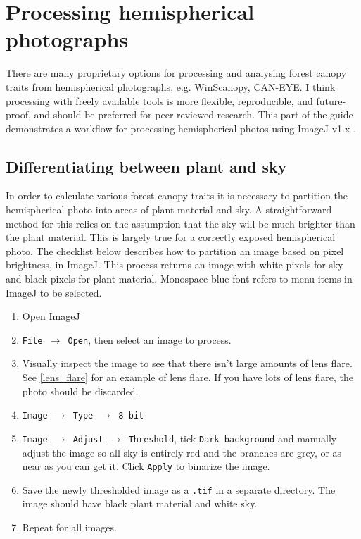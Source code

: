 \documentclass[11pt,a4paper]{article}
\newcommand\menu[1]{\texttt{\color{blue}#1}}
\newcommand\file[1]{\texttt{\underline{#1}}}
\begin{document}
\section{Processing hemispherical photographs}

There are many proprietary options for processing and analysing forest canopy traits from hemispherical photographs, e.g. WinScanopy, CAN-EYE. I think processing with freely available tools is more flexible, reproducible, and future-proof, and should be preferred for peer-reviewed research. This part of the guide demonstrates a workflow for processing hemispherical photos using ImageJ v1.x \citep{Schneider2012}.

\subsection{Differentiating between plant and sky}

In order to calculate various forest canopy traits it is necessary to partition the hemispherical photo into areas of plant material and sky. A straightforward method for this relies on the assumption that the sky will be much brighter than the plant material. This is largely true for a correctly exposed hemispherical photo. The checklist below describes how to partition an image based on pixel brightness, in ImageJ. This process returns an image with white pixels for sky and black pixels for plant material. Monospace blue font refers to menu items in ImageJ to be selected.

\begin{enumerate}
	\item{Open ImageJ}
	\item{\menu{File $\rightarrow$ Open}, then select an image to process.}
	\item{Visually inspect the image to see that there isn't large amounts of lens flare. See \autoref{lens_flare} for an example of lens flare. If you have lots of lens flare, the photo should be discarded.}
	\item{\menu{Image $\rightarrow$ Type $\rightarrow$ 8-bit}}
	\item{\menu{Image $\rightarrow$ Adjust $\rightarrow$ Threshold}, tick \menu{Dark background} and manually adjust the image so all sky is entirely red and the branches are grey, or as near as you can get it. Click \menu{Apply} to binarize the image.}
	\item{Save the newly thresholded image as a \file{.tif} in a separate directory. The image should have black plant material and white sky.}
	\item{Repeat for all images.}
\end{enumerate}
\end{document}
